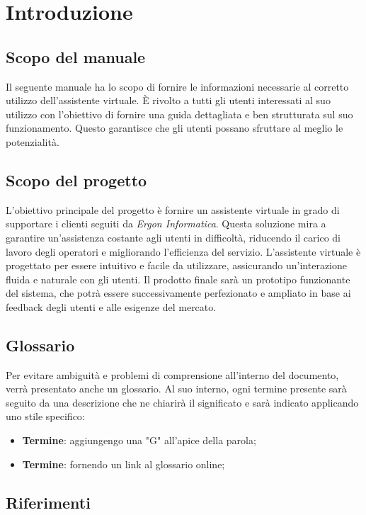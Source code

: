 \section{Introduzione}

\subsection{Scopo del manuale}
Il seguente manuale ha lo scopo di fornire le informazioni necessarie al corretto utilizzo dell'assistente virtuale. È rivolto a tutti gli utenti interessati al suo utilizzo con l'obiettivo di fornire una guida dettagliata e ben strutturata sul suo funzionamento. Questo garantisce che gli utenti possano sfruttare al meglio le potenzialità.

\subsection{Scopo del progetto}
L'obiettivo principale del progetto è fornire un assistente virtuale in grado di supportare i clienti seguiti da \textit{Ergon Informatica}. Questa soluzione mira a garantire un'assistenza costante agli utenti in difficoltà, riducendo il carico di lavoro degli operatori e migliorando l'efficienza del servizio. L'assistente virtuale è progettato per essere intuitivo e facile da utilizzare, assicurando un'interazione fluida e naturale con gli utenti. Il prodotto finale sarà un prototipo funzionante del sistema, che potrà essere successivamente perfezionato e ampliato in base ai feedback degli utenti e alle esigenze del mercato.

\subsection{Glossario}
Per evitare ambiguità e problemi di comprensione all'interno del documento, verrà presentato anche un glossario. Al suo interno, ogni termine presente sarà seguito da una descrizione che ne chiarirà il significato e sarà indicato applicando uno stile specifico:
\begin{itemize}
    \item \textbf{Termine}: aggiungengo una "G" all'apice della parola;
    \item \textbf{Termine}: fornendo un link al glossario online;
\end{itemize}

\subsection{Riferimenti}

